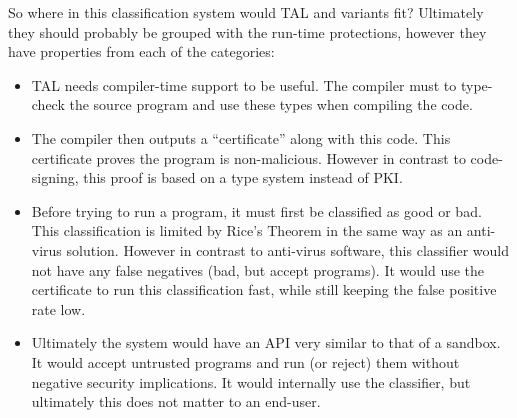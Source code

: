 So where in this classification system would TAL and variants fit? Ultimately
they should probably be grouped with the run-time protections, however they have
properties from each of the categories:

\begin{itemize}
\item TAL needs compiler-time support to be useful. The compiler must to
  type-check the source program and use these types when compiling the code.
\item The compiler then outputs a ``certificate'' along with this code. This
  certificate proves the program is non-malicious. However in contrast to
  code-signing, this proof is based on a type system instead of PKI.
\item Before trying to run a program, it must first be classified as good or
  bad. This classification is limited by Rice's Theorem in the same way as an
  anti-virus solution. However in contrast to anti-virus software, this
  classifier would not have any false negatives (bad, but accept programs). It
  would use the certificate to run this classification fast, while still keeping
  the false positive rate low.
\item Ultimately the system would have an API very similar to that of a
  sandbox. It would accept untrusted programs and run (or reject) them without
  negative security implications. It would internally use the classifier, but
  ultimately this does not matter to an end-user.
\end{itemize}






